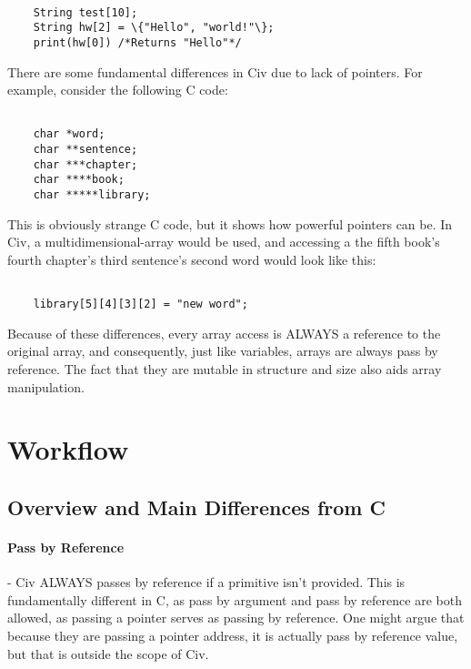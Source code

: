 \documentclass[a4paper]{article}
\begin{document}
{\selectfont
\begin{lstlisting}

	String test[10];
	String hw[2] = \{"Hello", "world!"\};
	print(hw[0]) /*Returns "Hello"*/
\end{lstlisting} 
} 

There are some fundamental differences in Civ due to lack of pointers. For example, consider the following C code:

{\selectfont
\begin{lstlisting}

	char *word;
	char **sentence;
	char ***chapter;
	char ****book;
	char *****library;
\end{lstlisting}
} 

This is obviously strange C code, but it shows how powerful pointers can be. In Civ, a multidimensional-array would be used, and accessing a the fifth book's fourth chapter's third sentence's second word would look like this:

{\selectfont
\begin{lstlisting}

	library[5][4][3][2] = "new word";
\end{lstlisting}
} 

Because of these differences, every array access is ALWAYS a reference to the original array, and consequently, just like variables, arrays are always pass by reference. The fact that they are mutable in structure and size also aids array manipulation.

\section{Workflow}
\subsection{Overview and Main Differences from C}

\paragraph{Pass by Reference} - Civ ALWAYS passes by reference if a primitive isn't provided. This is fundamentally different in C, as pass by argument and pass by reference are both allowed, as passing a pointer serves as passing by reference. One might argue that because they are passing a pointer address, it is actually pass by reference value, but that is outside the scope of Civ.
\end{document}

